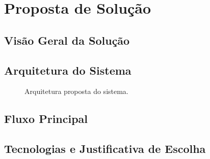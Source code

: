\section{Proposta de Solução}
\label{sec:proposta}

\subsection{Visão Geral da Solução}

\subsection{Arquitetura do Sistema}
\begin{figure}[h]
  \centering
  \caption{Arquitetura proposta do sistema.}
  \label{fig:arquitetura}
\end{figure}

\subsection{Fluxo Principal}

\subsection{Tecnologias e Justificativa de Escolha}
